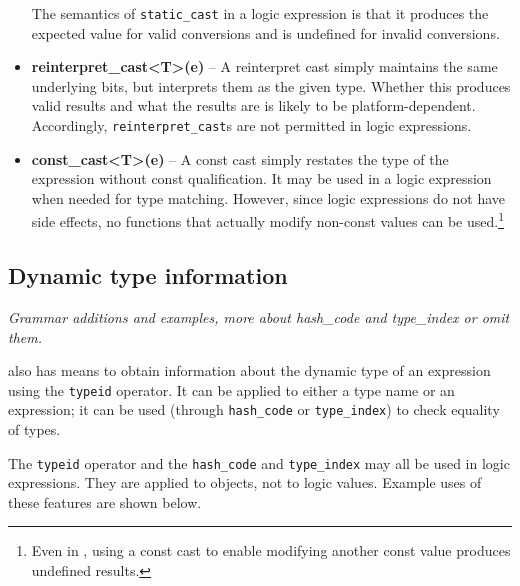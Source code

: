 \begin{itemize}
	The semantics of \lstinline|static_cast| in a logic expression is that it produces the expected value for valid conversions and is undefined for invalid conversions.
	
	\item \textbf{reinterpret\_cast<T>(e)} -- A reinterpret cast simply  maintains the same underlying bits, but interprets them as the given type. 
	Whether this produces valid results and what the results are is likely to be platform-dependent. 
	Accordingly, \lstinline|reinterpret_cast|s are not permitted in logic expressions.
	
	\item \textbf{const\_cast<T>(e)} -- A const cast simply restates the type of the expression without const qualification. 
	It may be used in a logic expression when needed for type matching. 
	However, since logic expressions do not have side effects, no functions that actually modify non-const values can be used.\footnote{Even in \lang, using a const cast to enable modifying another const value produces undefined results.}
	
\end{itemize}


\subsection{Dynamic type information}

\emph{Grammar additions and examples, more about hash\_code and type\_index or omit them.}

\lang also has means to obtain information about the dynamic
type of an expression using the \lstinline|typeid| operator. It can be applied to either a type name or an expression; it can be used (through \lstinline|hash_code| or \lstinline|type_index|) to check equality of types.

The  \lstinline|typeid| operator and the \lstinline|hash_code| and \lstinline|type_index| may all be used in logic expressions. They are
applied to \lang objects, not to logic values. Example uses of these features are
shown below.




